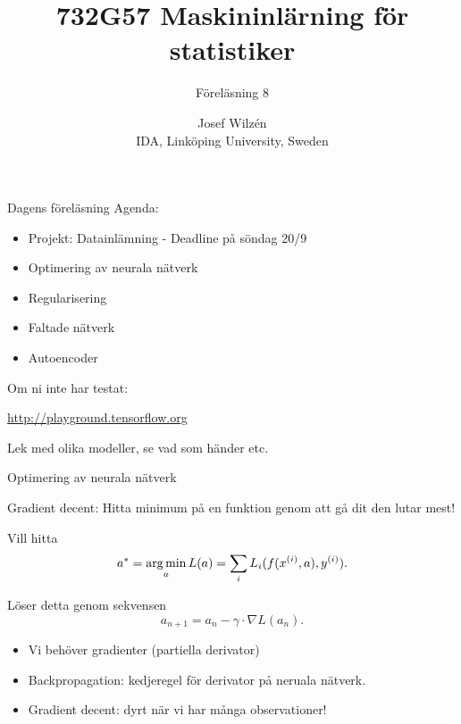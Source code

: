 \documentclass[10pt,english]{beamer}
\title{732G57 Maskininlärning för statistiker}
\subtitle{Föreläsning 8}
\date{}
\author{Josef Wilzén \\ IDA, Linköping University, Sweden}
\begin{document}
\maketitle

\begin{frame}{Dagens föreläsning}
    Agenda:
    \begin{itemize}
        \item Projekt: Datainlämning - Deadline på söndag 20/9
        \item Optimering av neurala nätverk
        \item Regularisering
        \item Faltade nätverk
        \item Autoencoder
    \end{itemize}
    
    Om ni inte har testat:

    \url{http://playground.tensorflow.org}

    Lek med olika modeller, se vad som händer etc.

    
    
\end{frame}

\begin{frame}{Optimering av neurala nätverk}
    
    Gradient decent: Hitta minimum på en funktion genom att gå dit den lutar mest!

    Vill hitta
    \begin{equation*}
        a^* = \operatorname*{arg\,min}_a L(a) = \sum_i L_i(f(x^{(i)},a), y^{(i)}).
    \end{equation*}

    Löser detta genom sekvensen
    \begin{equation*}
        a_{n+1} = a_n - \gamma \cdot \nabla L(a_n).
    \end{equation*}

    \begin{itemize}
        \item Vi behöver gradienter (partiella derivator)
        \item Backpropagation: kedjeregel för derivator på neruala nätverk.
        \item Gradient decent: dyrt när vi har många observationer!
    \end{itemize}

\end{frame}
\end{document}
